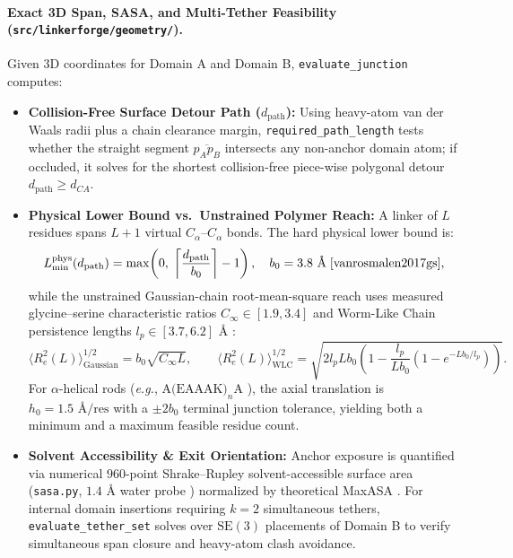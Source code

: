 \documentclass[11pt]{article}
\begin{document}
\paragraph{Exact 3D Span, SASA, and Multi-Tether Feasibility (\texttt{src/linkerforge/geometry/}).}
Given 3D coordinates for Domain A and Domain B, \texttt{evaluate\_junction} computes:
\begin{itemize}
  \item \textbf{Collision-Free Surface Detour Path ($d_{\text{path}}$):} Using heavy-atom van der Waals radii \cite{bondi1964vdw} plus a chain clearance margin, \texttt{required\_path\_length} tests whether the straight segment $\overline{p_A p_B}$ intersects any non-anchor domain atom; if occluded, it solves for the shortest collision-free piece-wise polygonal detour $d_{\text{path}} \ge d_{CA}$.
  \item \textbf{Physical Lower Bound vs.\ Unstrained Polymer Reach:} A linker of $L$ residues spans $L+1$ virtual $C_\alpha\text{--}C_\alpha$ bonds. The hard physical lower bound is:
  \begin{equation}
    L_{\min}^{\text{phys}}(d_{\text{path}}) = \max\!\left(0,\; \left\lceil \frac{d_{\text{path}}}{b_0} \right\rceil - 1\right), \quad b_0 = 3.8\text{ \AA} \;\text{\cite{vanrosmalen2017gs}},
  \end{equation}
  while the unstrained Gaussian-chain root-mean-square reach uses measured glycine--serine characteristic ratios $C_\infty \in [1.9, 3.4]$ and Worm-Like Chain persistence lengths $l_p \in [3.7, 6.2]\text{ \AA}$ \cite{kratky1949wlc,vanrosmalen2017gs}:
  \begin{equation}
    \langle R_e^2(L) \rangle_{\text{Gaussian}}^{1/2} = b_0 \sqrt{C_\infty L}, \qquad
    \langle R_e^2(L) \rangle_{\text{WLC}}^{1/2} = \sqrt{2 l_p L b_0 \left(1 - \frac{l_p}{L b_0}\left(1 - e^{-L b_0 / l_p}\right)\right)}.
  \end{equation}
  For $\alpha$-helical rods (\emph{e.g.}, $\text{A(EAAAK)}_n\text{A}$ \cite{arai2001helical}), the axial translation is $h_0 = 1.5\text{ \AA/res}$ \cite{pauling1951helix} with a $\pm 2 b_0$ terminal junction tolerance, yielding both a minimum and a maximum feasible residue count.
  \item \textbf{Solvent Accessibility \& Exit Orientation:} Anchor exposure is quantified via numerical $960$-point Shrake--Rupley solvent-accessible surface area (\texttt{sasa.py}, $1.4\text{ \AA}$ water probe \cite{shrake1973sasa,lee1971sasa}) normalized by theoretical MaxASA \cite{tien2013maxasa,rost1994rsa}. For internal domain insertions requiring $k=2$ simultaneous tethers, \texttt{evaluate\_tether\_set} solves over $\text{SE}(3)$ placements of Domain B to verify simultaneous span closure and heavy-atom clash avoidance.
\end{itemize}
\end{document}
